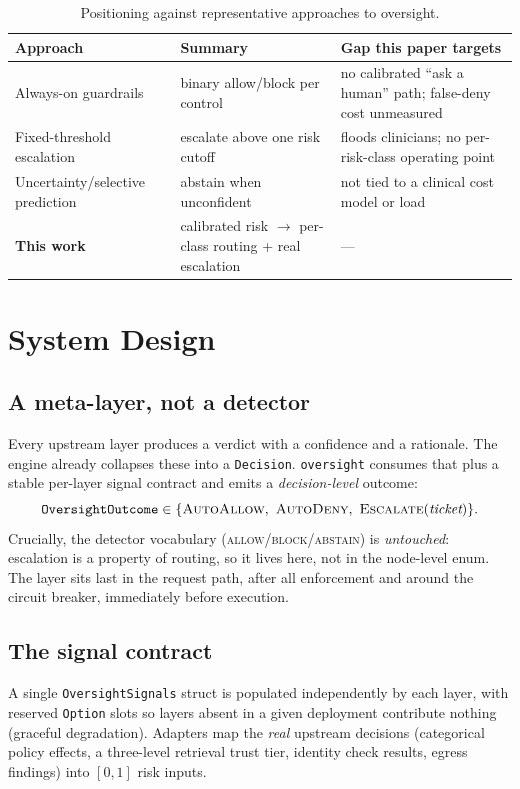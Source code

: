 \documentclass[11pt]{article}
\begin{document}
\begin{table}[htb]\centering\small
\begin{tabular}{L{3.2cm}L{4.2cm}L{4.4cm}}
\toprule
Approach & Summary & Gap this paper targets \\
\midrule
Always-on guardrails~\cite{schwoebel2026haarf} & binary allow/block per control & no calibrated ``ask a human'' path; false-deny cost unmeasured \\
Fixed-threshold escalation & escalate above one risk cutoff & floods clinicians; no per-risk-class operating point \\
Uncertainty/selective prediction~\cite{selective2017} & abstain when unconfident & not tied to a clinical cost model or load \\
\textbf{This work} & calibrated risk $\to$ per-class routing + real escalation & --- \\
\bottomrule
\end{tabular}
\caption{Positioning against representative approaches to oversight.}
\label{tab:related}
\end{table}

\section{System Design}\label{sec:design}
\subsection{A meta-layer, not a detector}
Every upstream layer produces a verdict with a confidence and a rationale. The engine
already collapses these into a \texttt{Decision}. \texttt{oversight} consumes that
plus a stable per-layer signal contract and emits a \emph{decision-level} outcome:
\[
\texttt{OversightOutcome} \in \{\textsc{AutoAllow},\ \textsc{AutoDeny},\
\textsc{Escalate}(\textit{ticket})\}.
\]
Crucially, the detector vocabulary (\textsc{allow}/\textsc{block}/\textsc{abstain})
is \emph{untouched}: escalation is a property of routing, so it lives here, not in the
node-level enum. The layer sits last in the request path, after all enforcement and
around the circuit breaker, immediately before execution.

\subsection{The signal contract}
A single \texttt{OversightSignals} struct is populated independently by each layer,
with reserved \texttt{Option} slots so layers absent in a given deployment contribute
nothing (graceful degradation). Adapters map the \emph{real} upstream decisions
(categorical policy effects, a three-level retrieval trust tier, identity check
results, egress findings) into $[0,1]$ risk inputs.
\end{document}
